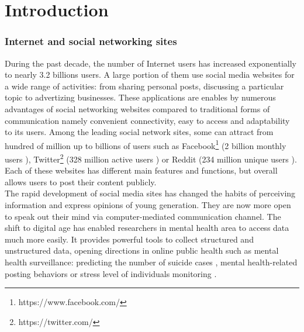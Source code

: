 
\chapter{Introduction}

\subsection*{Internet and social networking sites}
During the past decade, the number of Internet users has increased exponentially to nearly 3.2 billions users. A large portion of them use social media websites for a wide range of activities: from sharing personal posts, discussing a particular topic to advertizing businesses. These applications are enables by numerous advantages of social networking websites compared to traditional forms of communication namely convenient connectivity, easy to access and adaptability to its users. Among the leading social network sites, some can attract from hundred of million up to billions of users such as Facebook\footnote{https://www.facebook.com/} (2 billion monthly users \cite{Welch2017}), Twitter\footnote{https://twitter.com/} (328 million active users \cite{Aslam2017}) or Reddit\cite{https://www.reddit.com/} (234 million unique users \cite{Alexa2017}). Each of these websites has different main features and functions, but overall allows users to post their content publicly.\\
The rapid development of social media sites has changed the habits of perceiving information and express opinions of young generation. They are now more open to speak out their mind via computer-mediated communication channel. The shift to digital age has enabled researchers in mental health area to access data much more easily. It provides powerful tools to collect structured and unstructured data, opening directions in online public health such as mental health surveillance: predicting the number of suicide cases \cite{Won2013}, mental health-related posting behaviors \cite{Berry2017} or stress level of individuals monitoring \cite{Liu2017}. \\
